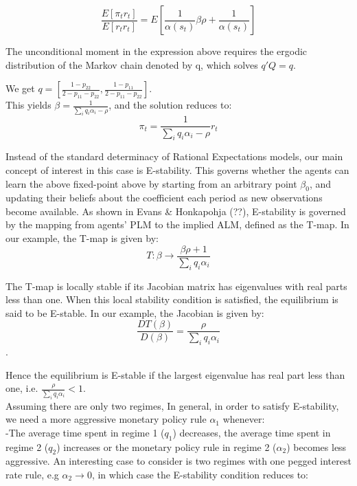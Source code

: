 \documentclass[12pt,reqno]{article}
\numberwithin{equation}{section}
\begin{document}
$$\frac{ E[\pi_t r_t]}{E[r_t r_t]} = E[ \frac{1}{\alpha(s_t)} \beta \rho + \frac{1}{\alpha(s_t)}]$$

The unconditional moment in the expression above requires the ergodic distribution of the Markov chain denoted by q, which solves $ q' Q = q $.

We get $ q= [ \frac{1-p_{22}}{2-p_{11}- p_{22}}, \frac{1-p_{11}}{2-p_{11}-p_{22}}] $. \\

This yields $ \beta = \frac{1}{\sum_i q_i \alpha_i  -\rho } $, and the solution reduces to: \\

$$ \pi_t = \frac{1}{\sum_i q_i \alpha_i  -\rho} r_t $$

Instead of the standard determinacy of Rational Expectations models, our main concept of interest in this case is E-stability. This governs whether the agents can learn the above fixed-point above by starting from an arbitrary point $\beta_0$, and updating their beliefs about the coefficient each period as new observations become available. As shown in Evans \& Honkapohja (??), E-stability is governed by the mapping from agents' PLM to the implied ALM, defined as the T-map. In our example, the T-map is given by: \\

$$ T: \beta \rightarrow \frac{\beta \rho + 1 }{\sum_i q_i \alpha_i} $$

The T-map is locally stable if its Jacobian matrix has eigenvalues with real parts less than one. When this local stability condition is satisfied, the equilibrium is said to be E-stable. In our example, the Jacobian is given by: \\

$$ \frac{DT(\beta)}{D(\beta)} = \frac{\rho}{\sum_i q_i \alpha_i} $$. 

Hence the equilibrium is E-stable if the largest eigenvalue has real part less than one, i.e. $\frac{\rho}{\sum_i q_i \alpha_i} < 1 $. \\

Assuming there are only two regimes, In general, in order to satisfy E-stability, we need a more aggressive monetary policy rule $\alpha_1 $ whenever: \\

\noindent
-The average time spent in regime 1 ($q_1 $) decreases, the average time spent in regime 2 ($q_2 $) increases or the monetary policy rule in regime 2 ($\alpha_2 $) becomes less aggressive. An interesting case to consider is two regimes with one pegged interest rate rule, e.g $\alpha_2 \rightarrow 0 $, in which case the E-stability condition reduces to: 
\end{document}
